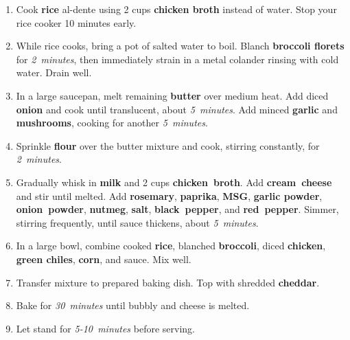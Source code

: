 \documentclass[11pt,letterpaper]{article}
\begin{document}
\begin{enumerate}
    \item Cook \textbf{rice} al-dente using 2 cups \textbf{chicken broth} instead of water. Stop your rice cooker 10 minutes early.
    
    \item While rice cooks, bring a pot of salted water to boil. Blanch \textbf{broccoli florets} for \textit{2~minutes}, then immediately strain in a metal colander rinsing with cold water. Drain well.
    
    \item In a large saucepan, melt remaining \textbf{butter} over medium heat. Add diced \textbf{onion} and cook until translucent, about \textit{5~minutes}. Add minced \textbf{garlic} and \textbf{mushrooms}, cooking for another \textit{5~minutes}.
    
    \item Sprinkle \textbf{flour} over the butter mixture and cook, stirring constantly, for \textit{2~minutes}.
    
    \item Gradually whisk in \textbf{milk} and 2 cups \textbf{chicken~broth}. Add \textbf{cream~cheese} and stir until melted. Add \textbf{rosemary}, \textbf{paprika}, \textbf{MSG}, \textbf{garlic powder}, \textbf{onion~powder}, \textbf{nutmeg}, \textbf{salt},  \textbf{black~pepper}, and \textbf{red~pepper}. Simmer, stirring frequently, until sauce thickens, about \textit{5~minutes}.
    
    \item In a large bowl, combine cooked \textbf{rice}, blanched \textbf{broccoli}, diced \textbf{chicken}, \textbf{green chiles}, \textbf{corn}, and sauce. Mix well.
    
    \item Transfer mixture to prepared baking dish. Top with shredded \textbf{cheddar}.
    
    \item Bake for \textit{30~minutes} until bubbly and cheese is melted.
    
    \item Let stand for \textit{5-10~minutes} before serving.
\end{enumerate}

\newpage
\end{document}
